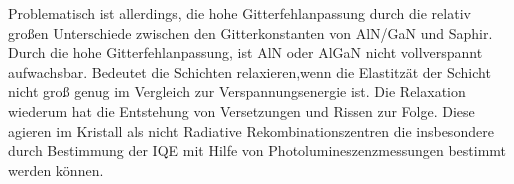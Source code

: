 Problematisch ist allerdings, die hohe Gitterfehlanpassung durch die relativ großen Unterschiede zwischen den Gitterkonstanten von AlN/GaN und Saphir.
Durch die hohe Gitterfehlanpassung, ist AlN oder AlGaN nicht vollverspannt aufwachsbar. Bedeutet die Schichten relaxieren,wenn die Elastitzät der Schicht nicht groß genug im Vergleich zur Verspannungsenergie ist. Die Relaxation wiederum hat die Entstehung von Versetzungen und Rissen zur Folge. Diese agieren im Kristall als nicht Radiative Rekombinationszentren die insbesondere durch Bestimmung der IQE mit Hilfe von Photolumineszenzmessungen bestimmt werden können. 








